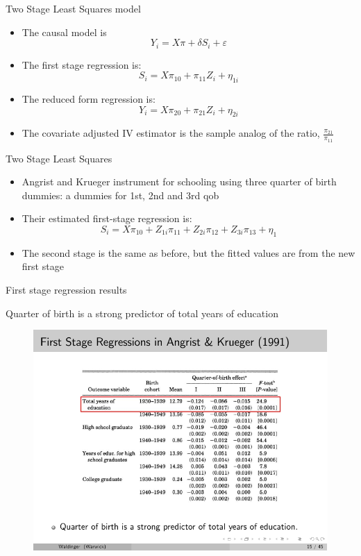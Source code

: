 \documentclass{beamer}
\begin{document}
\begin{frame}{Two Stage Least Squares model}
	
	\begin{itemize}
	\item The causal model is $$Y_i = X \pi + \delta S_i + \varepsilon$$
	\item The first stage regression is:$$S_i=X\pi_{10} + \pi_{11}Z_i + \eta_{1i}$$
	\item The reduced form regression is:$$Y_i=X\pi_{20} + \pi_{21}Z_i+\eta_{2i}$$
	\item The covariate adjusted IV estimator is the sample analog of the ratio, $\frac{\pi_{21}}{\pi_{11}}$
	\end{itemize}

\end{frame}

\begin{frame}{Two Stage Least Squares}
	
	\begin{itemize}
	\item Angrist and Krueger instrument for schooling using three quarter of birth dummies:  a dummies for 1st, 2nd and 3rd qob
	\item Their estimated first-stage regression is:$$S_i=X\pi_{10} + Z_{1i}\pi_{11} + Z_{2i}\pi_{12} + Z_{3i}\pi_{13}+\eta_1$$
	\item The second stage is the same as before, but the fitted values are from the new first stage
	\end{itemize}

\end{frame}


\begin{frame}{First stage regression results}

	 Quarter of birth is a strong predictor of total years of education
	
	\begin{figure}
	\includegraphics{./lecture_includes/qob_5.pdf}
	\end{figure}

\end{frame}
\end{document}
